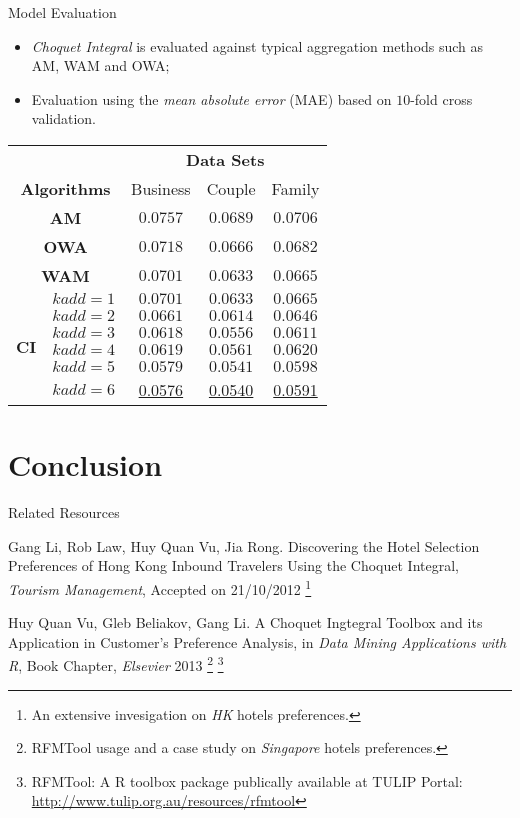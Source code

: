 \documentclass[
 size=12pt,
 paper=smartboard, %
 mode=present, %
 display=slides, %
 style=tulip,  %
 pauseslide,
 fleqn,leqno,clock]{powerdot}
\begin{document}
\begin{slide}[toc=,bm=]{Model Evaluation}
\begin{itemize}
 \item<1-> \emph{Choquet Integral} is evaluated against typical aggregation methods such as AM, WAM and OWA;
 \item<2-> Evaluation using the \emph{mean absolute  error} (MAE) based on $10$-fold cross validation.
\end{itemize}
{ \footnotesize \centering
\begin{tabular}{c c c c c}
\toprule
&   &\multicolumn{3}{c}{\textbf{Data Sets}}\\
\multicolumn{2}{c}{\textbf{Algorithms}}   & Business  & Couple & Family     \\
\midrule
\multicolumn{2}{c}{\textbf{AM}}    &$0.0757$ & $0.0689$& $0.0706$ \\
\multicolumn{2}{c}{\textbf{OWA}}     &$0.0718$ & $0.0666$& $0.0682$ \\
\multicolumn{2}{c}{\textbf{WAM}}    &$0.0701$ & $0.0633$& $0.0665$ \\
\midrule
\multirow{6}{*}{\textbf{CI}}
& $kadd = 1$ &     $0.0701$ & $0.0633$& $0.0665$ \\
& $kadd = 2$ &    $0.0661$ & $0.0614$& $0.0646$ \\
& $kadd = 3$ &     $0.0618$ & $0.0556$& $0.0611$ \\
& $kadd = 4$ &     $0.0619$ & $0.0561$& $0.0620$ \\
& $kadd = 5$ &     $0.0579$ & $0.0541$& $0.0598$ \\
& $kadd = 6$ &     \underline{0.0576} & \underline{0.0540}& \underline{0.0591} \\
\bottomrule
\end{tabular}
}
\end{slide}

\section{Conclusion}


\begin{slide}[toc=,bm=]{Related Resources}
\begin{thebibliography}{1}
 Gang Li, Rob Law, Huy Quan Vu, Jia Rong. 
Discovering the Hotel Selection Preferences of Hong Kong Inbound Travelers Using the Choquet Integral, 
\emph{Tourism Management}, Accepted on 21/10/2012
\footnote{An extensive invesigation on \emph{HK} hotels preferences.}

 Huy Quan Vu, Gleb Beliakov, Gang Li. 
A Choquet Ingtegral Toolbox and its Application in Customer's Preference Analysis, 
in \emph{Data Mining Applications with R}, Book Chapter, \emph{Elsevier} 2013
\footnote{RFMTool usage and a case study on \emph{Singapore} hotels preferences.}
\footnote{RFMTool: A R toolbox package publically available at TULIP Portal: \url{http://www.tulip.org.au/resources/rfmtool}}
\end{thebibliography}
\end{slide}
\end{document}
